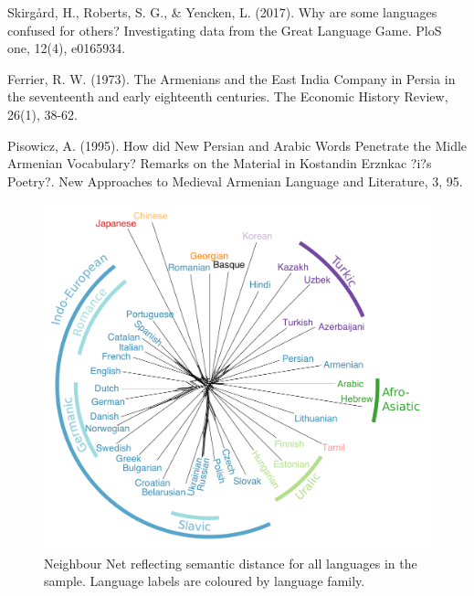 \documentclass[notitlepage]{report}
\begin{document}
Skirgård, H., Roberts, S. G., \& Yencken, L. (2017). Why are some languages confused for others? Investigating data from the Great Language Game. PloS one, 12(4), e0165934.

Ferrier, R. W. (1973). The Armenians and the East India Company in Persia in the seventeenth and early eighteenth centuries. The Economic History Review, 26(1), 38-62.

Pisowicz, A. (1995). How did New Persian and Arabic Words Penetrate the Midle Armenian Vocabulary? Remarks on the Material in Kostandin Erznkac ?i?s Poetry?. New Approaches to Medieval Armenian Language and Literature, 3, 95.

\makeatletter 
\renewcommand{\thefigure}{4.3.\@arabic\c@figure}
\makeatother

\begin{figure}[hb]
\begin{center}
\includegraphics[width=\linewidth]{../results/splitstree/LinguisticDistances2.pdf}
\caption{Neighbour Net reflecting semantic distance for all languages in the sample. Language labels are coloured by language family.}
\label{fig:NNAll}
\end{center}
\end{figure}
\end{document}
